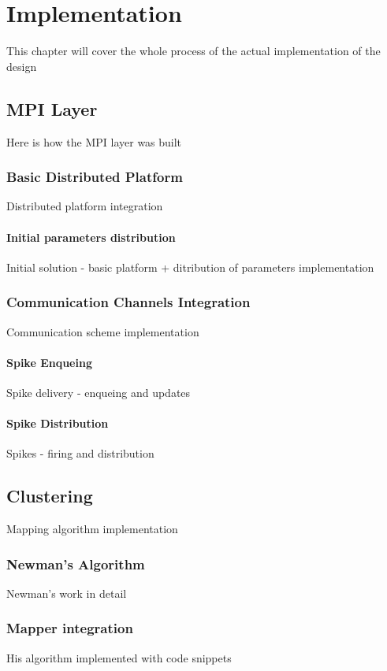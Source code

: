 \chapter{Implementation}

This chapter will cover the whole process of the actual implementation of the design

\section{MPI Layer}

Here is how the MPI layer was built

\subsection{Basic Distributed Platform}

Distributed platform integration

\subsubsection{Initial parameters distribution}

Initial solution - basic platform + ditribution of parameters implementation

\subsection{Communication Channels Integration}

Communication scheme implementation

\subsubsection{Spike Enqueing}

Spike delivery - enqueing and updates

\subsubsection{Spike Distribution}

Spikes - firing and distribution

\section{Clustering}

Mapping algorithm implementation

\subsection{Newman's Algorithm}

Newman's work in detail

\subsection{Mapper integration}

His algorithm implemented with code snippets
